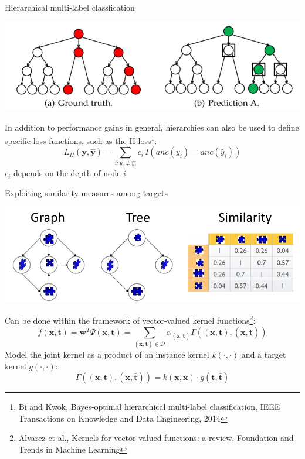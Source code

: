 \documentclass[]{beamer}
\renewcommand{\vec}[1]{\boldsymbol{#1}}
\begin{document}
\begin{frame}{Hierarchical multi-label classfication}

\vspace{-0.2cm}
\begin{center}
\includegraphics[width=\textwidth]{Figures/hloss}
\end{center}

\vspace{-0.2cm}
In addition to performance gains in general, hierarchies can also be used to define specific loss functions, such as the H-loss\footnote{Bi and Kwok, Bayes-optimal hierarchical multi-label classification, IEEE Transactions on Knowledge and Data Engineering, 2014}: 
$$L_H(\vec{y},\hat{\vec{y}}) = \sum_{i: y_i \neq \hat{y_i}} c_i \, I(\textit{anc}(y_i) = \textit{anc}(\hat{y}_i))$$
$c_i$ depends on the depth of node $i$
\end{frame}

\begin{frame}{Exploiting similarity measures among targets}

\begin{center}
\includegraphics[scale=0.3,trim = 600 0 0 90,clip]{pics/targetrelations}
\end{center} 
Can be done within the framework of vector-valued kernel functions\footnote{Alvarez et al., Kernels for vector-valued functions: a review, Foundation and Trends in Machine Learning}:
\begin{equation*}
\label{eq:pairwise}
f(\vec{x},\vec{t}) = \vec{w}^T \Psi(\vec{x},\vec{t}) = \sum_{(\bar{\vec{x}},\bar{\vec{t}}) \in \mathcal{D}} \alpha_{(\bar{\vec{x}},\bar{\vec{t}})} \Gamma((\vec{x},\vec{t}),(\bar{\vec{x}},\bar{\vec{t}})) 
\end{equation*}
Model the joint kernel as a product of an instance kernel $k(\cdot,\cdot)$ and a target kernel $g(\cdot,\cdot)$: 
$$\Gamma((\vec{x},\vec{t}),(\bar{\vec{x}},\bar{\vec{t}})) = k(\vec{x},\bar{\vec{x}}) \cdot g(\vec{t},\bar{\vec{t}})$$

\end{frame}
\end{document}
